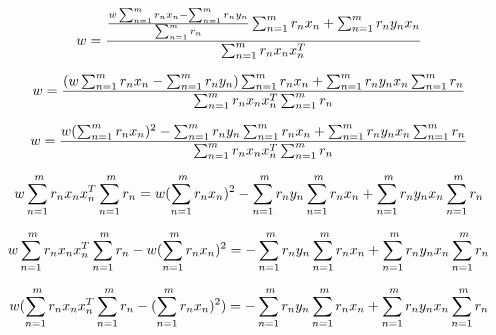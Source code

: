 \documentclass[a4paper]{article}
\begin{document}
$$w  = \frac{\frac{w \sum_{n=1}^{\\m}r_n x_n - \sum_{n=1}^{\\m} r_n y_n}{\sum_{n=1}^{\\m} r_n} \sum_{n=1}^{\\m} r_n x_n + \sum_{n=1}^{\\m} r_n y_n x_n} {\sum_{n=1}^{\\m}r_n x_n x_n^T}$$

$$w  = \frac{(w \sum_{n=1}^{\\m}r_n x_n - \sum_{n=1}^{\\m} r_n y_n) \sum_{n=1}^{\\m} r_n x_n + \sum_{n=1}^{\\m} r_n y_n x_n \sum_{n=1}^{\\m} r_n} {\sum_{n=1}^{\\m}r_n x_n x_n^T \sum_{n=1}^{\\m} r_n}$$

$$w  = \frac{w ({\sum_{n=1}^{\\m}r_n x_n})^2 - \sum_{n=1}^{\\m} r_n y_n \sum_{n=1}^{\\m} r_n x_n + \sum_{n=1}^{\\m} r_n y_n x_n \sum_{n=1}^{\\m} r_n} {\sum_{n=1}^{\\m}r_n x_n x_n^T \sum_{n=1}^{\\m} r_n}$$

$$w \sum_{n=1}^{\\m}r_n x_n x_n^T \sum_{n=1}^{\\m} r_n  = w ({\sum_{n=1}^{\\m}r_n x_n})^2 - \sum_{n=1}^{\\m} r_n y_n \sum_{n=1}^{\\m} r_n x_n + \sum_{n=1}^{\\m} r_n y_n x_n \sum_{n=1}^{\\m} r_n$$

$$w \sum_{n=1}^{\\m}r_n x_n x_n^T \sum_{n=1}^{\\m} r_n - w ({\sum_{n=1}^{\\m}r_n x_n})^2 = - \sum_{n=1}^{\\m} r_n y_n \sum_{n=1}^{\\m} r_n x_n + \sum_{n=1}^{\\m} r_n y_n x_n \sum_{n=1}^{\\m} r_n$$

$$w (\sum_{n=1}^{\\m}r_n x_n x_n^T \sum_{n=1}^{\\m} r_n - ({\sum_{n=1}^{\\m}r_n x_n})^2) = - \sum_{n=1}^{\\m} r_n y_n \sum_{n=1}^{\\m} r_n x_n + \sum_{n=1}^{\\m} r_n y_n x_n \sum_{n=1}^{\\m} r_n$$
\end{document}
